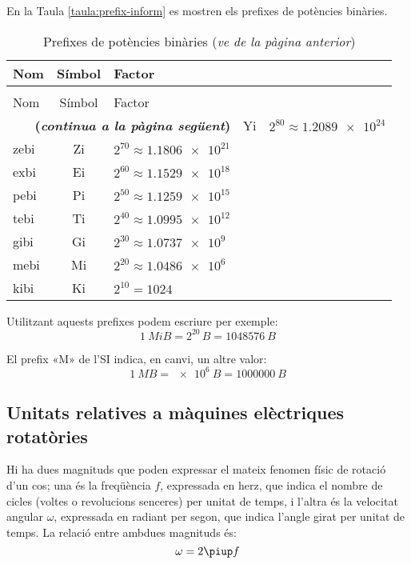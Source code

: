 En la Taula \vref{taula:prefix-inform} es mostren els prefixes de potències binàries.
\begin{longtable}[h]{lcl}
   \caption{\label{taula:prefix-inform} Prefixes de potències binàries}\\
   \toprule[1pt]
    Nom & Símbol  & Factor \\
   \midrule
   \endfirsthead
   \caption[]{Prefixes de potències binàries (\emph{ve de la pàgina anterior})}\\
   \toprule[1pt]
    Nom & Símbol  & Factor \\
   \midrule
   \endhead
   \midrule
   \multicolumn{3}{r}{\sffamily\bfseries\color{NavyBlue}(\emph{continua a la pàgina següent})}
   \endfoot
   \endlastfoot
   yobi & Yi   & $2^{80} \approx \num{1,2089e24}$ \\
   zebi & Zi   & $2^{70} \approx \num{1,1806e21}$ \\
   exbi & Ei   & $2^{60} \approx \num{1,1529e18}$ \\
   pebi & Pi   & $2^{50} \approx \num{1,1259e15}$ \\
   tebi & Ti   & $2^{40} \approx \num{1,0995e12}$ \\
   gibi & Gi   & $2^{30} \approx \num{1,0737e9}$  \\
   mebi & Mi   & $2^{20} \approx \num{1,0486e6}$ \\
   kibi & Ki   & $2^{10} = 1024$  \\
   \bottomrule[1pt]
\end{longtable}
        
   

Utilitzant aquests prefixes podem escriure per exemple:
\[\SI{1}{MiB} = 2^{20}\si{\,B} = \SI{1048576}{B}\]

El prefix «M» de l'SI indica, en canvi, un altre valor:
\[\SI{1}{MB} =\SI{e6}{B} = \SI{1000000}{B}\]



\subsection{Unitats relatives a màquines elèctriques rotatòries}

Hi ha dues magnituds que poden expressar el mateix fenomen físic de rotació d'un cos; una és la freqüència $f$, expressada en herz, que indica el nombre de cicles (voltes o revolucions senceres) per unitat de temps, i l'altra és la velocitat angular $\omega$, expressada en radiant per segon, que indica l'angle girat per unitat de temps. La relació entre ambdues magnituds és:
\begin{equation}
  \omega = 2 \piup f
\end{equation}

